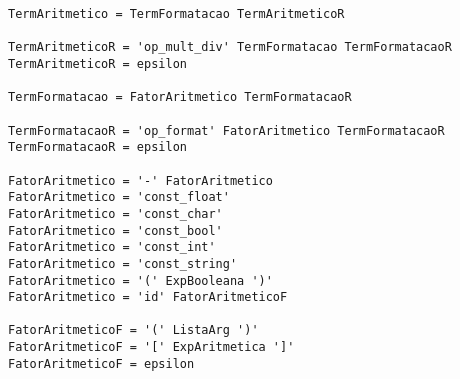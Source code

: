 \documentclass[
  12pt,				%
  oneside,			%
  a4paper,			%
  english,			%
  french,				%
  spanish,			%
  brazil,				%
]{abntex2}
\begin{document}
\begin{lstlisting}[label={code:gramatica-original},caption={Gramática
    original da linguagem de programação LisC.},style={mystyle}]
TermAritmetico = TermFormatacao TermAritmeticoR

TermAritmeticoR = 'op_mult_div' TermFormatacao TermFormatacaoR
TermAritmeticoR = epsilon

TermFormatacao = FatorAritmetico TermFormatacaoR

TermFormatacaoR = 'op_format' FatorAritmetico TermFormatacaoR
TermFormatacaoR = epsilon

FatorAritmetico = '-' FatorAritmetico
FatorAritmetico = 'const_float'
FatorAritmetico = 'const_char'
FatorAritmetico = 'const_bool'
FatorAritmetico = 'const_int'
FatorAritmetico = 'const_string'
FatorAritmetico = '(' ExpBooleana ')'
FatorAritmetico = 'id' FatorAritmeticoF

FatorAritmeticoF = '(' ListaArg ')'
FatorAritmeticoF = '[' ExpAritmetica ']'
FatorAritmeticoF = epsilon

\end{lstlisting}




\postextual


\printindex
\end{document}
